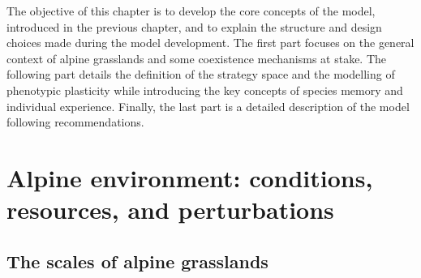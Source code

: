 %


\begin{fullwidth}
The objective of this chapter is to develop the core concepts of the model, introduced in the previous chapter, and to explain the structure and design choices made during the model development. The first part focuses on the general context of alpine grasslands and some coexistence mechanisms at stake. The following part details the definition of the strategy space and the modelling of phenotypic plasticity while introducing the key concepts of species memory and individual experience. Finally, the last part is a detailed description of the model following \cite{grimm_standard_2006} recommendations.
\end{fullwidth}

\chapter{Alpine environment: conditions, resources, and perturbations}
\section{The scales of alpine grasslands}

